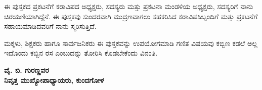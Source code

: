 {\medskip

ಈ ಪುಸ್ತಕದ ಪ್ರಕಟನೆಗೆ ಕರಾವಿಪದ ಅಧ್ಯಕ್ಷರು, ಸದಸ್ಯರು ಮತ್ತು ಪ್ರಕಟನಾ ಮಂಡಳಿಯ ಅಧ್ಯಕ್ಷರು, ಸದಸ್ಯರಿಗೆ ನಾನು ಚಿರಯಣಿಯಾಗಿದ್ದೆನೆ. ಈ ಪುಸ್ತಕವು ಸುಂದರವಾಗಿ ಮುದ್ರಣವಾಗಲು ಸಹಕರಿಸಿದ ಕರಾವಿಪಸಿಬ್ಬಂದಿಗೆ ಮತ್ತು ಪ್ರಕಟನೆಗೆ ಸಹಾಯಮಾಡಿದವರಿಗೆ ನಾನು ಸ್ಮರಿಸುತ್ತಿದೆ. 


ಮಕ್ಕಳು, ಶಿಕ್ಷಕರು ಹಾಗೂ ಸಾರ್ವಜನಿಕರು ಈ ಪುಸ್ತಕವನ್ನು ಉಪಯೋಗಮಾಡಿ ಗಣಿತ ವಿಷಯವು ಕಬ್ಬಿಣ ಕಡಲೆ ಅಲ್ಲ ಇದೊಂದು ಕಬ್ಬಿನ ರಸ ಎಂಬುದನ್ನು ತೋರಿಸಿ ಕೊಡಬೇಕೆಂದು ವಿನಂತಿ. 



\begin{flushright}
{\bf ವೈ. ಬಿ. ಗುರಣ್ಣವರ}\\
{\bf ನಿವೃತ್ತ ಮುಖ್ಯೋಪಾಧ್ಯಾಯರು,  ಕುಂದಗೋಳ}\\
\end{flushright}


}\relax




